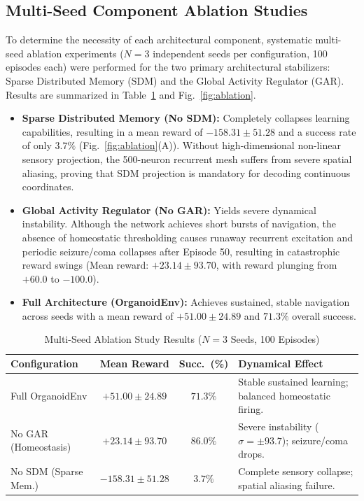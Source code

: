 \documentclass[journal,twocolumn]{IEEEtran}
\begin{document}
\subsection{Multi-Seed Component Ablation Studies}\label{sec:ablation}

To determine the necessity of each architectural component, systematic multi-seed ablation experiments ($N=3$ independent seeds per configuration, 100 episodes each) were performed for the two primary architectural stabilizers: Sparse Distributed Memory (SDM) and the Global Activity Regulator (GAR). Results are summarized in Table~\ref{table:ablation} and Fig.~\ref{fig:ablation}.

\begin{itemize}
\item \textbf{Sparse Distributed Memory (No SDM):} Completely collapses learning capabilities, resulting in a mean reward of $-158.31 \pm 51.28$ and a success rate of only $3.7\%$ (Fig.~\ref{fig:ablation}(A)). Without high-dimensional non-linear sensory projection, the 500-neuron recurrent mesh suffers from severe spatial aliasing, proving that SDM projection is mandatory for decoding continuous coordinates.
\item \textbf{Global Activity Regulator (No GAR):} Yields severe dynamical instability. Although the network achieves short bursts of navigation, the absence of homeostatic thresholding causes runaway recurrent excitation and periodic seizure/coma collapses after Episode 50, resulting in catastrophic reward swings (Mean reward: $+23.14 \pm 93.70$, with reward plunging from $+60.0$ to $-100.0$).
\item \textbf{Full Architecture (OrganoidEnv):} Achieves sustained, stable navigation across seeds with a mean reward of $+51.00 \pm 24.89$ and $71.3\%$ overall success.
\end{itemize}

\begin{table}[h]
\centering
\renewcommand{\arraystretch}{1.3}
\caption{Multi-Seed Ablation Study Results ($N=3$ Seeds, 100 Episodes)}
\label{table:ablation}
\begin{tabularx}{\linewidth}{l c c X}
\toprule
\textbf{Configuration} & \textbf{Mean Reward} & \textbf{Succ.\ (\%)} & \textbf{Dynamical Effect} \\
\midrule
Full OrganoidEnv       & $\mathbf{+51.00 \pm 24.89}$ & $\mathbf{71.3\%}$ & Stable sustained learning; balanced homeostatic firing. \\
No GAR (Homeostasis)   & $+23.14 \pm 93.70$          & $86.0\%$          & Severe instability ($\sigma = \pm 93.7$); seizure/coma drops. \\
No SDM (Sparse Mem.)   & $-158.31 \pm 51.28$         & $3.7\%$           & Complete sensory collapse; spatial aliasing failure. \\
\bottomrule
\end{tabularx}
\end{table}
\end{document}
